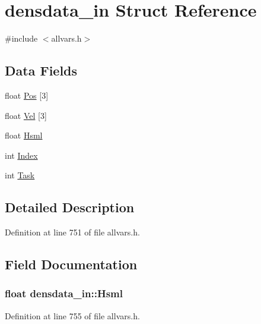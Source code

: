 \hypertarget{structdensdata__in}{
\section{densdata\_\-in Struct Reference}
\label{structdensdata__in}
}


{\ttfamily \#include $<$allvars.h$>$}

\subsection*{Data Fields}
\begin{DoxyCompactItemize}
\item 
float \hyperlink{structdensdata__in_a619b6e6d76f91b047119249915527164}{Pos} \mbox{[}3\mbox{]}
\item 
float \hyperlink{structdensdata__in_a8df7f2cfb255b800bbbbb69d674ae4ac}{Vel} \mbox{[}3\mbox{]}
\item 
float \hyperlink{structdensdata__in_a5a572c3fbe7024feabd787fde3bd8689}{Hsml}
\item 
int \hyperlink{structdensdata__in_a1c79a4d4fdcc9e483946193f2d030308}{Index}
\item 
int \hyperlink{structdensdata__in_a010be125c58096f5cd2fec47f210747b}{Task}
\end{DoxyCompactItemize}


\subsection{Detailed Description}


Definition at line 751 of file allvars.h.



\subsection{Field Documentation}
\hypertarget{structdensdata__in_a5a572c3fbe7024feabd787fde3bd8689}{
\subsubsection[{Hsml}]{\setlength{\rightskip}{0pt plus 5cm}float {\bf densdata\_\-in::Hsml}}}
\label{structdensdata__in_a5a572c3fbe7024feabd787fde3bd8689}


Definition at line 755 of file allvars.h.



